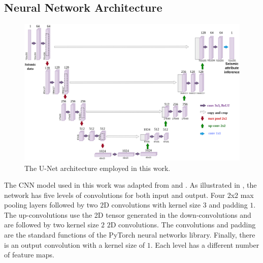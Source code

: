 \documentclass[conference]{IEEEtran}
\begin{document}

\subsection{Neural Network Architecture}

\def\figattwidth{0.329}
\begin{figure}[!t]
    \centering
    \includegraphics[width=0.75\linewidth]{Fig/arquitetura.png}
    \caption{The U-Net architecture employed in this work.
    }
    \label{fig:arquitetura}
\end{figure}

The CNN model used in this work was adapted from \cite{milesial} and \cite{unet-bio}. 
As illustrated in , the network has five levels of convolutions for both input and output. 
Four 2x2 max pooling layers followed by two $2$D convolutions with kernel size $3$ and padding $1$.
The up-convolutions use the 2D tensor generated in the down-convolutions and are followed by two kernel size $2$ $2$D convolutions. 
The convolutions and padding are the standard functions of the PyTorch neural networks library. Finally, there is an output convolution with a kernel size of $1$. Each level has a different number of feature maps.%
\end{document}
